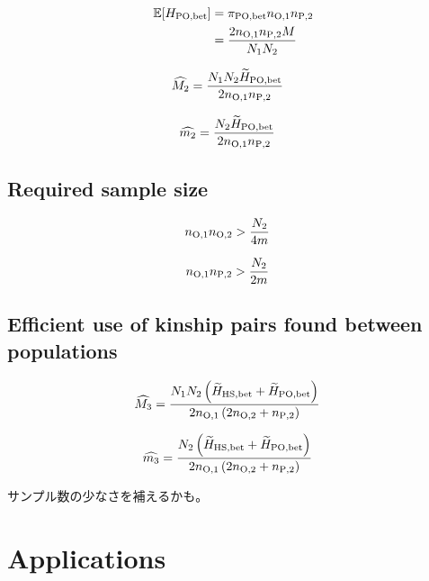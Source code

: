 \documentclass[12pt, English]{article}
\begin{document}
\begin{spacing}{1.9}
\begin{align}
\mathbb{E}[H_{\rm PO, bet}] &= \pi_{\rm PO,bet} n_{\rm O, 1} n_{\rm P, 2} \nonumber\\
&= \frac{ 2 n_{\rm O, 1} n_{\rm P, 2} M } { N_{1} N_{2} }
\label{PO-2}
\end{align}

\begin{align}
\widehat{M_2} &= \frac{N_{1} N_{2} \widetilde{H}_{\rm PO,bet} } {2 n_{\rm O, 1} n_{\rm P, 2} }
\label{PO-3}
\end{align}

\begin{align}
\widehat{m_2} &= \frac{N_{2} \widetilde{H}_{\rm PO,bet} } {2 n_{\rm O, 1} n_{\rm P, 2} }
\label{PO-4}
\end{align}

\subsection{Required sample size}

\begin{align}
n_{\rm O, 1} n_{\rm O, 2} &> \frac{ N_{2} } { 4m }
\label{RS-1}
\end{align}

\begin{align}
n_{\rm O, 1} n_{\rm P, 2} &> \frac{ N_{2} } { 2m }
\label{RS-2}
\end{align}

\subsection{Efficient use of kinship pairs found between populations}

\begin{align}
\widehat{M_3} &= \frac{ N_{1} N_{2} \left(\widetilde{H}_{\rm HS,bet} + \widetilde{H}_{\rm PO,bet}\right) } {2n_{\rm O, 1} \left(2 n_{\rm O, 2} + n_{\rm P, 2}\right) }
\label{AP-1}
\end{align}

\begin{align}
\widehat{m_3} &= \frac{ N_{2} \left(\widetilde{H}_{\rm HS,bet} + \widetilde{H}_{\rm PO,bet}\right) } {2n_{\rm O, 1} \left(2 n_{\rm O, 2} + n_{\rm P, 2}\right) }
\label{AP-2}
\end{align}

サンプル数の少なさを補えるかも。

\section{Applications}\label{sec3}



\end{spacing}
\end{document}

